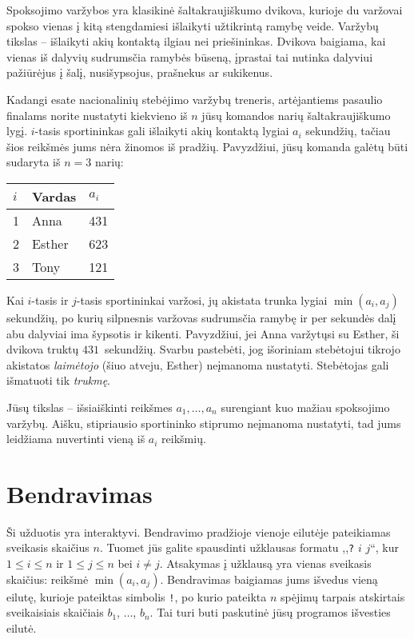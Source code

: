 

\noindent
Spoksojimo varžybos yra klasikinė šaltakraujiškumo dvikova, 
kurioje du varžovai spokso vienas į kitą stengdamiesi išlaikyti užtikrintą ramybę veide.
Varžybų tikslas -- išlaikyti akių kontaktą ilgiau nei priešininkas.
Dvikova baigiama, kai vienas iš dalyvių sudrumsčia ramybės būseną, 
įprastai tai nutinka dalyviui pažiūrėjus į šalį, nusišypsojus, prašnekus ar sukikenus.

Kadangi esate nacionalinių stebėjimo varžybų treneris, artėjantiems pasaulio finalams
norite nustatyti kiekvieno iš $n$ jūsų komandos narių šaltakraujiškumo lygį.
$i$-tasis sportininkas gali išlaikyti akių kontaktą lygiai $a_i$ sekundžių, tačiau šios reikšmės jums nėra žinomos iš pradžių.
Pavyzdžiui, jūsų komanda galėtų būti sudaryta iš $n=3$ narių:

\medskip
\begin{tabular}{lll}
  $i$ & Vardas & $a_i$\\\hline
  1 & Anna &  431 \\
  2 & Esther & 623 \\
  3 & Tony &  121\\
\end{tabular}

\medskip
Kai $i$-tasis ir $j$-tasis sportininkai varžosi, jų akistata trunka lygiai $\min(a_i, a_j)$ sekundžių, 
po kurių silpnesnis varžovas sudrumsčia ramybę ir per sekundės dalį abu dalyviai ima šypsotis ir kikenti.
Pavyzdžiui, jei Anna varžytųsi su Esther, ši dvikova truktų $431$~sekundžių.
Svarbu pastebėti, jog išoriniam stebėtojui tikrojo akistatos \emph{laimėtojo} (šiuo atveju, Esther) neįmanoma nustatyti.
Stebėtojas gali išmatuoti tik \emph{trukmę}.

Jūsų tikslas -- išsiaiškinti reikšmes $a_1,\ldots, a_n$ surengiant kuo mažiau spoksojimo varžybų.
Aišku, stipriausio sportininko stiprumo neįmanoma nustatyti, tad jums leidžiama nuvertinti vieną iš $a_i$ reikšmių.

\section*{Bendravimas}

Ši užduotis yra interaktyvi.
Bendravimo pradžioje vienoje eilutėje pateikiamas sveikasis skaičius $n$.
Tuomet jūs galite spausdinti užklausas formatu ,,\texttt{?} $i$ $j$``, kur $1\leq i\leq n$ ir $1\leq j\leq n$ bei $i\neq j$.
Atsakymas į užklausą yra vienas sveikasis skaičius: reikšmė $\min(a_i, a_j)$.
Bendravimas baigiamas jums išvedus vieną eilutę, kurioje pateiktas simbolis \texttt{!},
po kurio pateikta $n$ spėjimų tarpais atskirtais sveikaisiais skaičiais $b_1$, $\ldots$, $b_n$.  
Tai turi buti paskutinė jūsų programos išvesties eilutė.

